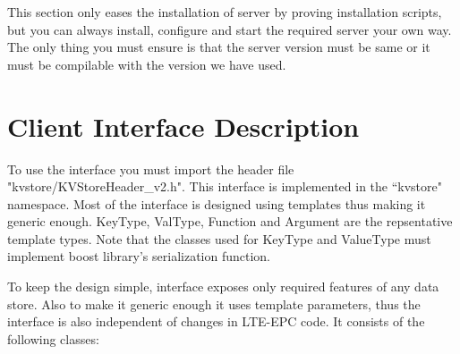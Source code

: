 \documentclass[11pt]{article}
\begin{document}
This section only eases the installation of server by proving installation scripts, but you can always install, configure and start the required server your own way. The only thing you must ensure is that the server version must be same or it must be compilable with the version we have used.



\section{Client Interface Description}
To use the interface you must import the header file "kvstore/KVStoreHeader\_v2.h". This interface is implemented in the ``kvstore" namespace. Most of the interface is designed using templates thus making it generic enough. KeyType, ValType, Function and Argument are the repsentative template types. Note that the classes used for KeyType and ValueType must implement boost library's serialization function.


To keep the design simple, interface exposes only required features of any data store. Also to make it generic enough it uses template parameters, thus the interface is also independent of changes in LTE-EPC code. It consists of the following classes:
\end{document}
